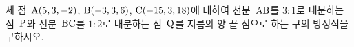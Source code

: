 세 점~$\mathrm{A}(5{,}\mkern3mu\mathopen{}3{,}\mkern3mu\mathopen{}-2)$, $\mathrm{B}(-3{,}\mkern3mu\mathopen{}3{,}\mkern3mu\mathopen{}6)$, $\mathrm{C}(-15{,}\mkern3mu\mathopen{}3{,}\mkern3mu\mathopen{}18)$에 대하여 선분~$\mathrm{AB}$를 $3:1$로 내분하는 점~$\mathrm{P}$와 선분~$\mathrm{BC}$를 $1:2$로 내분하는 점~$\mathrm{Q}$를 지름의 양 끝 점으로 하는 구의 방정식을 구하시오.
